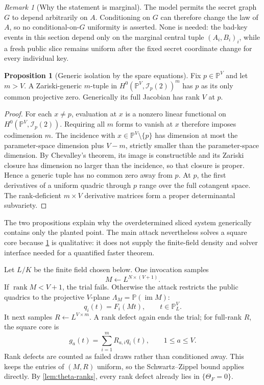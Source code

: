 \documentclass[11pt,a4paper]{article}
\theoremstyle{definition}
\newtheorem{proposition}[theorem]{Proposition}
\theoremstyle{remark}
\newtheorem{remark}[theorem]{Remark}
\newcommand{\PP}{\mathbb P}
\newcommand{\rank}{\operatorname{rank}}
\begin{document}
\begin{remark}[Why the statement is marginal]\label{rem:slice-law-marginal}
The model permits the secret graph $G$ to depend arbitrarily on $A$.  Conditioning on $G$ can therefore change the law of $A$, so no conditional-on-$G$ uniformity is asserted.  None is needed: the bad-key events in this section depend only on the marginal central tuple $(A_i,B_i)_i$, while a fresh public slice remains uniform after the fixed secret coordinate change for every individual key.
\end{remark}

\begin{proposition}[Generic isolation by the spare equations]\label{prop:generic-full-isolation}
Fix $p\in\PP^V$ and let $m>V$.  A Zariski-generic $m$-tuple in $H^0(\PP^V,\mathcal I_p(2))^m$ has $p$ as its only common projective zero.  Generically its full Jacobian has rank $V$ at $p$.
\end{proposition}

\begin{proof}
For each $x\ne p$, evaluation at $x$ is a nonzero linear functional on $H^0(\PP^V,\mathcal I_p(2))$.  Requiring all $m$ forms to vanish at $x$ therefore imposes codimension $m$.  The incidence with $x\in\PP^V\setminus\{p\}$ has dimension at most the parameter-space dimension plus $V-m$, strictly smaller than the parameter-space dimension.  By Chevalley's theorem, its image is constructible and its Zariski closure has dimension no larger than the incidence, so that closure is proper.  Hence a generic tuple has no common zero away from $p$.  At $p$, the first derivatives of a uniform quadric through $p$ range over the full cotangent space.  The rank-deficient $m\times V$ derivative matrices form a proper determinantal subvariety.
\end{proof}

The two propositions explain why the overdetermined sliced system generically contains only the planted point.  The main attack nevertheless solves a square core because \cref{prop:generic-full-isolation} is qualitative: it does not supply the finite-field density and solver interface needed for a quantified faster theorem.

Let $L/K$ be the finite field chosen below.  One invocation samples
\[
M\leftarrow L^{N\times(V+1)}.
\]
If $\rank M<V+1$, the trial fails.  Otherwise the attack restricts the public quadrics to the projective $V$-plane $\Lambda_M=\PP(\operatorname{im}M)$:
\[
q_i(t)=F_i(Mt),\qquad t\in\PP^V_L.
\]
It next samples $R\leftarrow L^{V\times m}$.  A rank defect again ends the trial; for full-rank $R$, the square core is
\[
g_a(t)=\sum_{i=1}^m R_{a,i}q_i(t),\qquad 1\le a\le V.
\]
Rank defects are counted as failed draws rather than conditioned away.  This keeps the entries of $(M,R)$ uniform, so the Schwartz--Zippel bound applies directly.  By \cref{lem:theta-ranks}, every rank defect already lies in $\{\Theta_F=0\}$.
\end{document}
